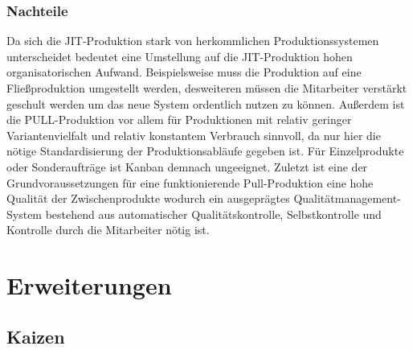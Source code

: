 \documentclass[00_ToyotaProduktionssystem.tex]{subfiles}
\begin{document}
\subsubsection{Nachteile}
Da sich die JIT-Produktion stark von herkommlichen Produktionssystemen unterscheidet bedeutet eine Umstellung auf die JIT-Produktion hohen organisatorischen Aufwand. Beispielsweise muss die Produktion auf eine Fließproduktion umgestellt werden, desweiteren müssen die Mitarbeiter verstärkt geschult werden um das neue System ordentlich nutzen zu können. Außerdem ist die PULL-Produktion vor allem für Produktionen mit relativ geringer Variantenvielfalt und relativ konstantem Verbrauch sinnvoll, da nur hier die nötige Standardisierung der Produktionsabläufe gegeben ist. Für Einzelprodukte oder Sonderaufträge ist Kanban demnach ungeeignet. Zuletzt ist eine der Grundvoraussetzungen für eine funktionierende Pull-Produktion eine hohe Qualität der Zwischenprodukte wodurch ein ausgeprägtes Qualitätmanagement-System bestehend aus automatischer Qualitätskontrolle, Selbstkontrolle und Kontrolle durch die Mitarbeiter nötig ist.
\section{Erweiterungen}

\subsection{Kaizen}
\end{document}
